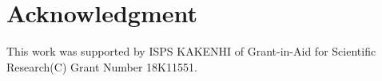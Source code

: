 \documentclass[journal]{IAENGtran}
\begin{document}
\section*{Acknowledgment}
This work was supported by ISPS KAKENHI of Grant-in-Aid for Scientific Research(C) Grant Number 18K11551.


\ifCLASSOPTIONcaptionsoff
  \newpage
\fi




\end{document}
